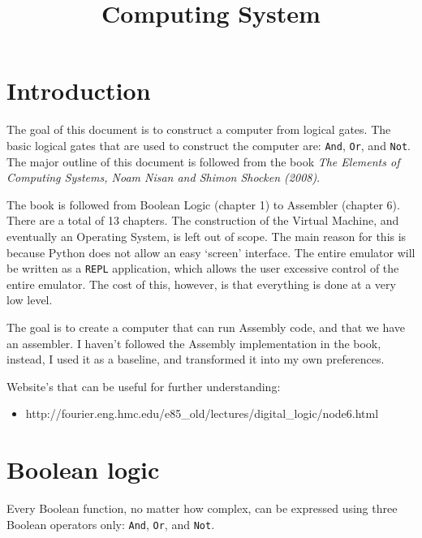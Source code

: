 \documentclass[11pt]{article}
\title{Computing System}
\providecommand{\tightlist}{%
      \setlength{\itemsep}{0pt}\setlength{\parskip}{0pt}}
\begin{document}
    
    
    \maketitle
    
    

    
    \hypertarget{introduction}{%
\section{Introduction}\label{introduction}}

    The goal of this document is to construct a computer from logical gates.
The basic logical gates that are used to construct the computer are:
\texttt{And}, \texttt{Or}, and \texttt{Not}. The major outline of this
document is followed from the book \emph{The Elements of Computing
Systems, Noam Nisan and Shimon Shocken (2008)}.

The book is followed from Boolean Logic (chapter 1) to Assembler
(chapter 6). There are a total of 13 chapters. The construction of the
Virtual Machine, and eventually an Operating System, is left out of
scope. The main reason for this is because Python does not allow an easy
`screen' interface. The entire emulator will be written as a
\texttt{REPL} application, which allows the user excessive control of
the entire emulator. The cost of this, however, is that everything is
done at a very low level.

The goal is to create a computer that can run Assembly code, and that we
have an assembler. I haven't followed the Assembly implementation in the
book, instead, I used it as a baseline, and transformed it into my own
preferences.

Website's that can be useful for further understanding:

\begin{itemize}
\tightlist
\item
  http://fourier.eng.hmc.edu/e85\_old/lectures/digital\_logic/node6.html
\end{itemize}

    \hypertarget{boolean-logic}{%
\section{Boolean logic}\label{boolean-logic}}

    Every Boolean function, no matter how complex, can be expressed using
three Boolean operators only: \texttt{And}, \texttt{Or}, and
\texttt{Not}.
\end{document}
